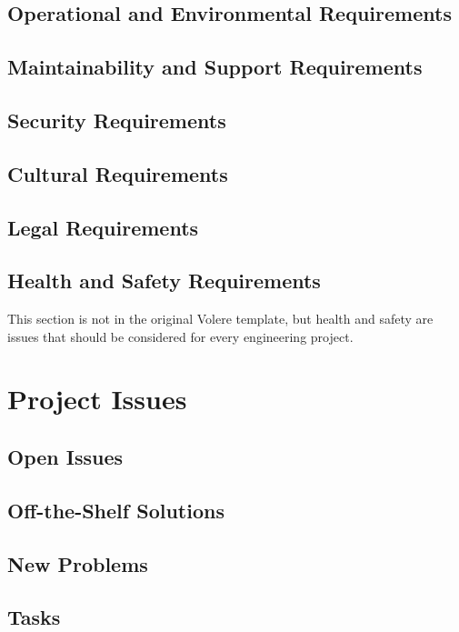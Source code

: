 \documentclass[12pt]{article}
\begin{document}
\subsection{Operational and Environmental Requirements}

\subsection{Maintainability and Support Requirements}

\subsection{Security Requirements}

\subsection{Cultural Requirements}

\subsection{Legal Requirements}

\subsection{Health and Safety Requirements}

This section is not in the original Volere template, but health and safety are issues that should
be considered for every engineering project.

\section{Project Issues}

\subsection{Open Issues}

\subsection{Off-the-Shelf Solutions}

\subsection{New Problems}

\subsection{Tasks}
\end{document}
